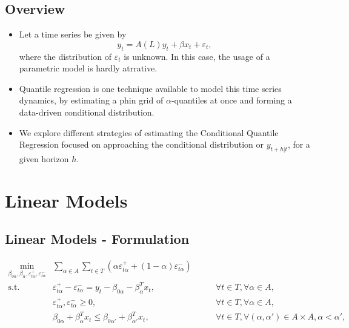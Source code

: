 \subsection{Overview}\label{overview}

\begin{itemize}
\item
  Let a time series be given by
  \[y_t = A(L)y_t + \beta x_t + \varepsilon_t,\] where the distribution
  of \(\varepsilon_t\) is unknown. In this case, the usage of a
  parametric model is hardly atrrative.
\item
  Quantile regression is one technique available to model this time
  series dynamics, by estimating a phin grid of \(\alpha\)-quantiles at
  once and forming a data-driven conditional distribution.
\item
  We explore different strategies of estimating the Conditional Quantile
  Regression focused on approaching the conditional distribution or
  \(y_{t+h|t}\), for a given horizon \(h\).
\end{itemize}

\section{Linear Models}\label{linear-models}

\subsection{Linear Models -
Formulation}\label{linear-models---formulation}

\tiny

\begin{eqnarray}
\min_{\beta_{0\alpha},\beta_\alpha,\varepsilon_{t\alpha}^{+}, \varepsilon_{t\alpha}^{-}} &  \sum_{\alpha \in A} \sum_{t \in T}\left(\alpha \varepsilon_{t \alpha}^{+}+(1-\alpha)\varepsilon_{t \alpha}^{-}\right) & \label{eq:linear-opt-1} \\
\mbox{s.t. } & \varepsilon_{t \alpha}^{+}-\varepsilon_{t \alpha}^{-}=y_{t} - \beta_{0\alpha} - \beta_{\alpha}^T x_{t}, & \qquad\forall t \in T,\forall \alpha \in A,\\
& \varepsilon_{t\alpha}^+,\varepsilon_{t\alpha}^- \geq 0, & \qquad\forall t \in T,\forall \alpha \in A,\\ \label{eq:linear-opt-ult}
& \beta_{0\alpha} + \beta_{\alpha}^T x_{t} \leq \beta_{0\alpha'} + \beta_{\alpha'}^T x_{t}, & \qquad \forall t \in T, \forall (\alpha, \alpha') \in A \times A,  \alpha < \alpha', \nonumber\\
\end{eqnarray}


